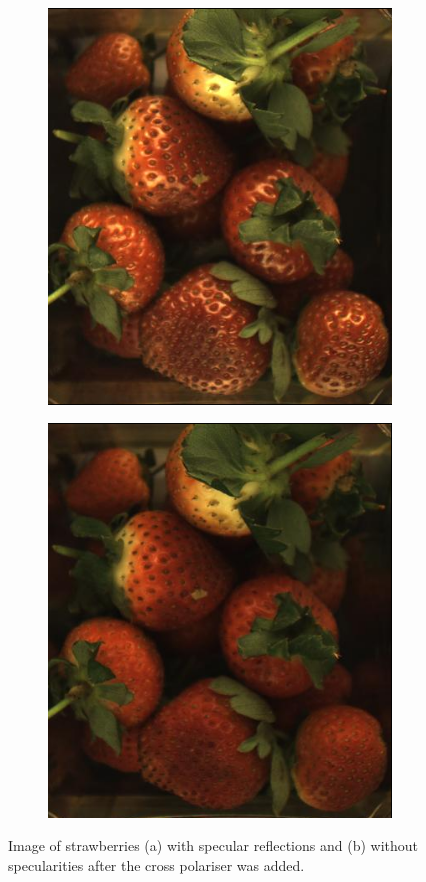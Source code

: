 \documentclass[fleqn,twoside]{article}
\begin{document}
\begin{figure}[ht]
	\centering
	\begin{subfigure}{.4\textwidth}
		\centering
		\includegraphics[width=.9\linewidth]{berries_spec.png}
		\caption{}
		\label{fig:berries_spec}
	\end{subfigure}%
	\begin{subfigure}{.4\textwidth}
		\centering
		\includegraphics[width=.9\linewidth]{berries_no_spec.png}
		\caption{}
		\label{fig:berries_no_spec}
	\end{subfigure}%
	\caption{Image of strawberries (a) with specular reflections and (b) without specularities after the cross polariser was added.}
	\label{}
\end{figure}
\end{document}
